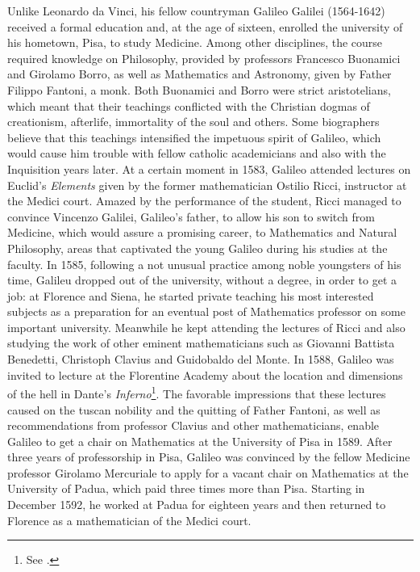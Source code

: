 Unlike Leonardo da Vinci, his fellow countryman Galileo Galilei (1564-1642) received a formal education and, at the age of sixteen, enrolled the university of his hometown, Pisa, to study Medicine. Among other disciplines, the course required knowledge on Philosophy, provided by professors Francesco Buonamici and Girolamo Borro, as well as Mathematics and Astronomy, given by Father Filippo Fantoni, a monk. Both Buonamici and Borro were strict aristotelians, which meant that their teachings conflicted with the Christian dogmas of creationism, afterlife, immortality of the soul and others. Some biographers believe that this teachings intensified the impetuous spirit of Galileo, which would cause him trouble with fellow catholic academicians and also with the Inquisition years later. At a certain moment in 1583, Galileo attended lectures on Euclid's \emph{Elements} given by the former mathematician Ostilio Ricci, instructor at the Medici court. Amazed by the performance of the student, Ricci managed to convince Vincenzo Galilei, Galileo's father, to allow his son to switch from Medicine, which would assure a promising career, to Mathematics and Natural Philosophy, areas that captivated the young Galileo during his studies at the faculty. In 1585, following a not unusual practice among noble youngsters of his time, Galileu dropped out of the university, without a degree, in order to get a job: at Florence and Siena, he started private teaching his most interested subjects as a preparation for an eventual post of Mathematics professor on some important university. Meanwhile he kept attending the lectures of Ricci and also studying the work of other eminent mathematicians such as Giovanni Battista Benedetti, Christoph Clavius and Guidobaldo del Monte. In 1588, Galileo was invited to lecture at the Florentine Academy about the location and dimensions of the hell in Dante's \emph{Inferno}\footnote{See \cite{wallace_1998_1}.}. The favorable impressions that these lectures caused on the tuscan nobility and the quitting of Father Fantoni, as well as recommendations from professor Clavius and other mathematicians, enable Galileo to get a chair on Mathematics at the University of Pisa in 1589. After three years of professorship in Pisa, Galileo was convinced by the fellow Medicine professor Girolamo Mercuriale to apply for a vacant chair on Mathematics at the University of Padua, which paid three times more than Pisa. Starting in December 1592, he worked at Padua for eighteen years and then returned to Florence as a mathematician of the Medici court.    

